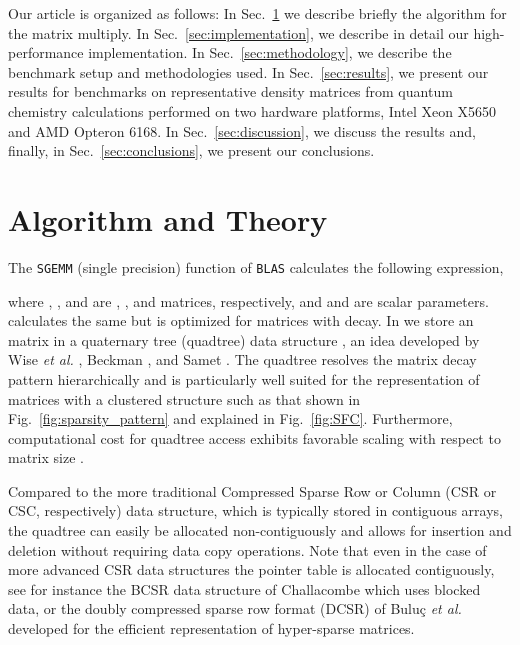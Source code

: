 Our article is organized as follows: In Sec.~\ref{sec:algorithm_and_theory} we
describe briefly the \SpAMM{} algorithm for the matrix multiply. In
Sec.~\ref{sec:implementation}, we describe in detail our high-performance
implementation. In Sec.~\ref{sec:methodology}, we describe the benchmark setup
and methodologies used. In Sec.~\ref{sec:results}, we present our results for
benchmarks on representative density matrices from quantum chemistry
calculations performed on two hardware platforms, Intel Xeon X5650 and AMD
Opteron 6168.  In Sec.~\ref{sec:discussion}, we discuss the results and,
finally, in Sec.~\ref{sec:conclusions}, we present our conclusions.

\section{Algorithm and Theory}
\label{sec:algorithm_and_theory}

The {\tt SGEMM} (single precision) function of {\tt BLAS} calculates the
following expression,

where , , and  are , , and 
matrices, respectively, and  and  are scalar parameters.
\SpAMM{} calculates the same but is optimized for matrices with decay. In
\SpAMM{} we store an  matrix in a quaternary tree (quadtree) data
structure \cite{Finkel1974}, an idea developed by Wise \emph{et al.}
\cite{springerlink:10.1007/3-540-51084-2_9, Wise:1984:RMQ:1089389.1089398,
Wise:Ahnentafel}, Beckman \cite{beckman1993parallel}, and Samet
\cite{Samet:1990:DAS:77589, Samet:2006:DBDS}.  The quadtree resolves the
matrix decay pattern hierarchically and is particularly well suited for the
representation of matrices with a clustered structure such as that shown in
Fig.~\ref{fig:sparsity_pattern} and explained in Fig.~\ref{fig:SFC}.
Furthermore, computational cost for quadtree access exhibits favorable scaling
with respect to matrix size \cite{Wise1990282}.

Compared to the more traditional Compressed Sparse Row or Column (CSR or CSC,
respectively) data structure, which is typically stored in contiguous arrays,
the quadtree can easily be allocated non-contiguously and allows for insertion
and deletion without requiring data copy operations.  Note that even in the
case of more advanced CSR data structures the pointer table is allocated
contiguously, see for instance the BCSR data structure of Challacombe
\cite{Challacombe:2000:SpMM} which uses blocked data, or the doubly compressed
sparse row format (DCSR) of Bulu\c{c} \emph{et al.} \cite{Buluc2008} developed
for the efficient representation of hyper-sparse matrices.

